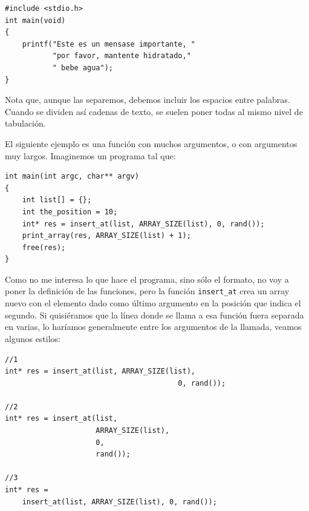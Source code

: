 \documentclass[a4paper]{article}
\begin{document}
\noindent
\begin{minipage}[H]{\linewidth}
\mbox{}
\begin{lstlisting}[style=C,
caption={Impresión larga},
label={lst:longprint}]
#include <stdio.h>
int main(void)
{
    printf("Este es un mensase importante, "
           "por favor, mantente hidratado,"
           " bebe agua");
}
\end{lstlisting}
\end{minipage}
Nota que, aunque las separemos, debemos incluir los espacios entre palabras.
Cuando se dividen así cadenas de texto, se suelen poner todas al mismo nivel
de tabulación.

El siguiente ejemplo es una función con muchos argumentos, o con argumentos
muy largos. Imaginemos un programa tal que:

\noindent
\begin{minipage}[H]{\linewidth}
\mbox{}
\begin{lstlisting}[style=C,
caption={Muchos argumentos},
label={lst:manyArgs}]
int main(int argc, char** argv)
{
    int list[] = {};
    int the_position = 10;
    int* res = insert_at(list, ARRAY_SIZE(list), 0, rand());
    print_array(res, ARRAY_SIZE(list) + 1);
    free(res);
}
\end{lstlisting}
\end{minipage}

Como no me interesa lo que hace el programa, sino sólo el formato, no voy a
poner la definición de las funciones, pero la función \verb!insert_at! crea
un array nuevo con el elemento dado como último argumento en la posición que
indica el segundo. Si quisiéramos que la línea donde se llama a esa función
fuera separada en varias, lo haríamos generalmente entre los argumentos de la
llamada, veamos algunos estilos:

\noindent
\begin{minipage}[H]{\linewidth}
\mbox{}
\begin{lstlisting}[style=C,
caption={Cómo acortar líneas con muchos argumentos},
label={lst:manyArgsShorting}]
//1
int* res = insert_at(list, ARRAY_SIZE(list),
                                        0, rand());

//2
int* res = insert_at(list,
                     ARRAY_SIZE(list),
                     0,
                     rand());

//3
int* res =
    insert_at(list, ARRAY_SIZE(list), 0, rand());
\end{lstlisting}
\end{minipage}
\end{document}
